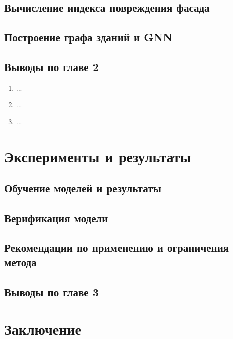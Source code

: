 \documentclass[14pt]{extarticle}
\begin{document}
\subsection{Вычисление индекса повреждения фасада}


\subsection{Построение графа зданий и GNN}


\subsection{Выводы по главе 2}

\begin{enumerate}[leftmargin=*, label=\arabic*.]
    \item ...
    \item ...
    \item ...
\end{enumerate}

\section{Эксперименты и результаты}
\label{sec:results}

\subsection{Обучение моделей и результаты}

\subsection{Верификация модели}

\subsection{Рекомендации по применению и ограничения метода}

\subsection{Выводы по главе 3}


\section*{Заключение}
\label{sec:outro}



\newpage
\printbibliography[heading=bibintoc, title={Список использованных источников}]
\end{document}
